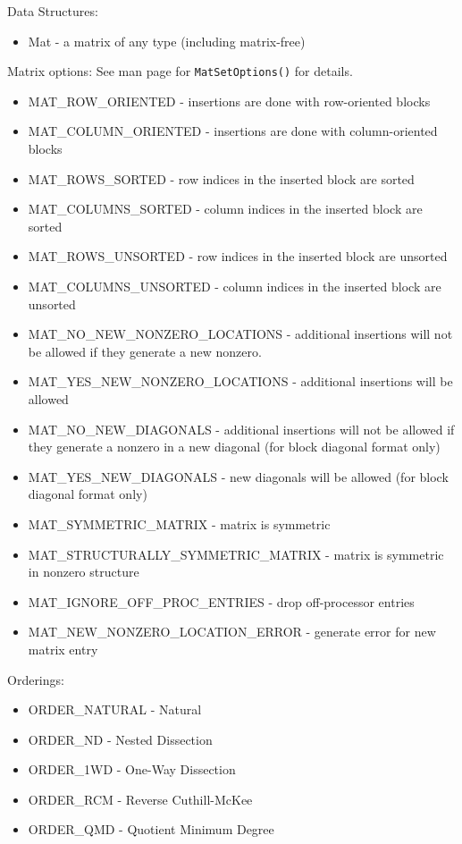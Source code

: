 \noindent
Data Structures: 
\begin{itemize}
\item Mat - a matrix of any type (including matrix-free)
\end{itemize}
Matrix options:  See man page for {\tt MatSetOptions()} for details. 
\begin{itemize}
\item MAT\_ROW\_ORIENTED - insertions are done with row-oriented blocks
\item MAT\_COLUMN\_ORIENTED - insertions are done with column-oriented blocks
\item MAT\_ROWS\_SORTED - row indices in the inserted block are sorted
\item MAT\_COLUMNS\_SORTED - column indices in the inserted block are sorted
\item MAT\_ROWS\_UNSORTED - row indices in the inserted block are unsorted
\item MAT\_COLUMNS\_UNSORTED - column indices in the inserted block are unsorted
\item MAT\_NO\_NEW\_NONZERO\_LOCATIONS - additional insertions will not be allowed if they
      generate a new nonzero.
\item MAT\_YES\_NEW\_NONZERO\_LOCATIONS - additional insertions will be allowed
\item MAT\_NO\_NEW\_DIAGONALS - additional insertions will not be allowed if
         they generate a nonzero in a new diagonal (for block diagonal format only)
\item MAT\_YES\_NEW\_DIAGONALS - new diagonals will be allowed (for block diagonal format only)
\item MAT\_SYMMETRIC\_MATRIX - matrix is symmetric
\item MAT\_STRUCTURALLY\_SYMMETRIC\_MATRIX - matrix is symmetric in nonzero structure
\item MAT\_IGNORE\_OFF\_PROC\_ENTRIES - drop off-processor entries
\item MAT\_NEW\_NONZERO\_LOCATION\_ERROR - generate error for new matrix entry
\end{itemize}
Orderings:
\begin{itemize}
\item ORDER\_NATURAL - Natural
\item ORDER\_ND - Nested Dissection
\item ORDER\_1WD - One-Way Dissection 
\item ORDER\_RCM - Reverse Cuthill-McKee
\item ORDER\_QMD - Quotient Minimum Degree
\end{itemize}
